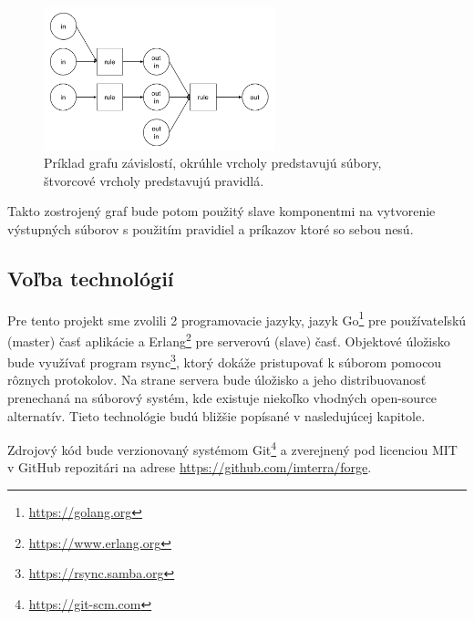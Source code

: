 \begin{figure}[h]
  \centerline{\includegraphics[width=0.6\textwidth]{images/dependency_graph}}
  \caption[Graf závislostí]{Príklad grafu závislostí, okrúhle vrcholy predstavujú
  súbory, štvorcové vrcholy predstavujú pravidlá.}
  \label{img:dependency_graph}
\end{figure}

Takto zostrojený graf bude potom použitý slave komponentmi na vytvorenie výstupných
súborov s použitím pravidiel a príkazov ktoré so sebou nesú.

\newpage

\subsection{Vo\v{l}ba technol\'{o}gi\'{i}}
\label{sub:solution:tech}

Pre tento projekt sme zvolili 2 programovacie jazyky, jazyk Go\footnote{\url{https://golang.org}}
pre používateľskú (master) časť aplikácie a Erlang\footnote{\url{https://www.erlang.org}}
pre serverovú (slave) časť. Objektové úložisko bude využívať program rsync\footnote{\url{https://rsync.samba.org}},
ktorý dokáže pristupovať k súborom pomocou rôznych protokolov. Na strane servera bude úložisko
a jeho distribuovanosť prenechaná na súborový systém, kde existuje niekoľko vhodných
open-source alternatív. Tieto technológie budú bližšie popísané v nasledujúcej kapitole.

Zdrojový kód bude verzionovaný systémom Git\footnote{\url{https://git-scm.com}} a
zverejnený pod licenciou MIT v GitHub repozitári na adrese \url{https://github.com/imterra/forge}.
